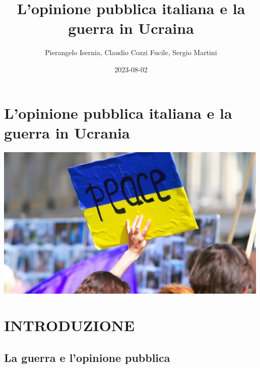 \documentclass[
]{book}
\title{L'opinione pubblica italiana e la guerra in Ucraina}
\author{Pierangelo Isernia, Claudio Cozzi Fucile, Sergio Martini}
\date{2023-08-02}
\begin{document}
\maketitle

{
\setcounter{tocdepth}{1}
\tableofcontents
}
\hypertarget{lopinione-pubblica-italiana-e-la-guerra-in-ucrania}{%
\chapter*{L'opinione pubblica italiana e la guerra in Ucrania}\label{lopinione-pubblica-italiana-e-la-guerra-in-ucrania}}

\includegraphics{Images/Ucrania.jpeg}

\hypertarget{introduzione}{%
\chapter{INTRODUZIONE}\label{introduzione}}

\hypertarget{la-guerra-e-lopinione-pubblica}{%
\section{La guerra e l'opinione pubblica}\label{la-guerra-e-lopinione-pubblica}}
\end{document}
